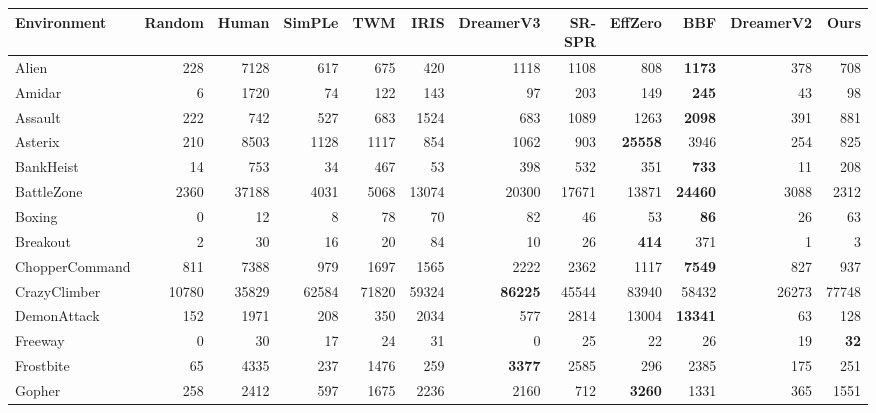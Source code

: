 \begin{tabular}{l|rr|rrrrrrrr|r}
    \toprule
    Environment    & Random & Human & SimPLe & TWM   & IRIS  & DreamerV3 & SR-SPR     & EffZero   & BBF       & DreamerV2 & Ours     \\
    \midrule
    Alien          & 228    & 7128  & 617    & 675   & 420   & 1118      & 1108       & 808       & \bf 1173  & 378       & 708      \\
    Amidar         & 6      & 1720  & 74     & 122   & 143   & 97        & 203        & 149       & \bf 245   & 43        & 98       \\
    Assault        & 222    & 742   & 527    & 683   & 1524  & 683       & 1089       & 1263      & \bf 2098  & 391       & 881      \\
    Asterix        & 210    & 8503  & 1128   & 1117  & 854   & 1062      & 903        & \bf 25558 & 3946      & 254       & 825      \\
    BankHeist      & 14     & 753   & 34     & 467   & 53    & 398       & 532        & 351       & \bf 733   & 11        & 208      \\
    BattleZone     & 2360   & 37188 & 4031   & 5068  & 13074 & 20300     & 17671      & 13871     & \bf 24460 & 3088      & 2312     \\
    Boxing         & 0      & 12    & 8      & 78    & 70    & 82        & 46         & 53        & \bf 86    & 26        & 63       \\
    Breakout       & 2      & 30    & 16     & 20    & 84    & 10        & 26         & \bf 414   & 371       & 1         & 3        \\
    ChopperCommand & 811    & 7388  & 979    & 1697  & 1565  & 2222      & 2362       & 1117      & \bf 7549  & 827       & 937      \\
    CrazyClimber   & 10780  & 35829 & 62584  & 71820 & 59324 & \bf 86225 & 45544      & 83940     & 58432     & 26273     & 77748    \\
    DemonAttack    & 152    & 1971  & 208    & 350   & 2034  & 577       & 2814       & 13004     & \bf 13341 & 63        & 128      \\
    Freeway        & 0      & 30    & 17     & 24    & 31    & 0         & 25         & 22        & 26        & 19        & \bf 32   \\
    Frostbite      & 65     & 4335  & 237    & 1476  & 259   & \bf 3377  & 2585       & 296       & 2385      & 175       & 251      \\
    Gopher         & 258    & 2412  & 597    & 1675  & 2236  & 2160      & 712        & \bf 3260  & 1331      & 365       & 1551     \\

\end{tabular}
